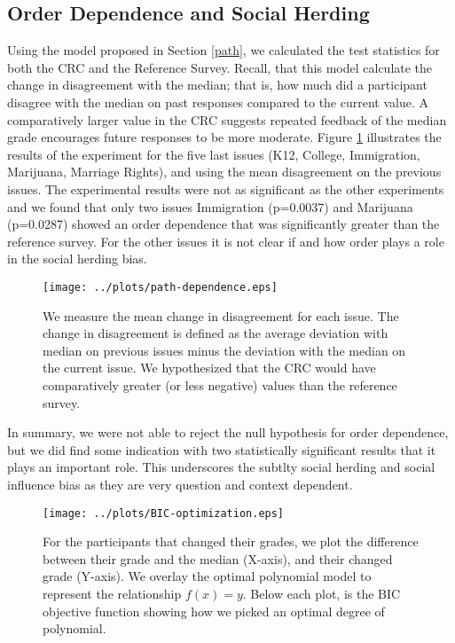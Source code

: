 \subsection{Order Dependence and Social Herding}
Using the model proposed in Section \ref{path}, we calculated the test statistics for both the CRC and the Reference Survey.
Recall, that this model calculate the change in disagreement with the median; that is, how much did a participant disagree with the median on past responses compared 
to the current value.
A comparatively larger value in the CRC suggests repeated feedback of the median grade encourages future responses to be more moderate.
Figure \ref{path-1} illustrates the results of the experiment for the five last issues (K12, College, Immigration, Marijuana, Marriage Rights), and using the mean disagreement on the previous issues.
The experimental results were not as significant as the other experiments and we found that only two issues Immigration (p=0.0037) and Marijuana (p=0.0287) showed an order dependence that was significantly greater than the reference survey.
For the other issues it is not clear if and how order plays a role in the social herding bias.

\begin{figure}[h]
  \centering
    \texttt{[image: ../plots/path-dependence.eps]}
      \caption{We measure the mean change in disagreement for each issue. The change in disagreement is defined as the average deviation with median on previous issues minus the deviation with the median on the current issue. We hypothesized that the CRC would have comparatively greater (or less negative) values than the reference survey.}
      \label{path-1}
\end{figure}

In summary, we were not able to reject the null hypothesis for order dependence, but we did find some indication with two statistically significant results that it plays an important role.
This underscores the subtlty social herding and social influence bias as they are very question and context dependent.

\begin{figure*}[ht!]
\hspace{-10em}
    \texttt{[image: ../plots/BIC-optimization.eps]}
      \caption{For the participants that changed their grades, we plot the difference between their grade and the median (X-axis), and their changed grade (Y-axis). We overlay the optimal polynomial model to represent the relationship $f(x) = y$. Below each plot, is the BIC objective function showing how we picked an optimal degree of polynomial.}
      \label{opt-1}
\end{figure*}


